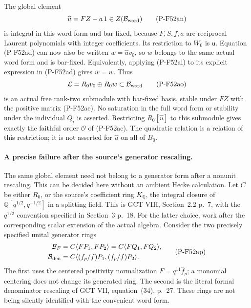 The global element
\[
         \widehat u=FZ-a\,1\in Z(\mathcal B_{\rm word})
                                                               \tag{P-F52an}
\]
is integral in this word form and bar-fixed, because
$F,S,f,a$ are reciprocal Laurent polynomials with integer
coefficients. Its restriction to $W_0$ is $\mathsf u$.
Equation (P-F52ad) can now also be written $w=\widehat u v_0$,
so $w$ belongs to the same actual word form and is bar-fixed.
Equivalently, applying (P-F52al) to its explicit expression
in (P-F52ad) gives $\overline w=w$.
Thus
\[
          \mathcal L=R_0v_0\oplus R_0w
                     \subset\mathcal B_{\rm word}
                                                               \tag{P-F52ao}
\]
is an actual free rank-two submodule with bar-fixed basis,
stable under $FZ$ with the positive matrix (P-F52ae).
No saturation in the full word form or stability under the
individual $Q_i$ is asserted. Restricting
$R_0[\widehat u]$ to this submodule gives exactly the
faithful order $\mathcal O$ of (P-F52ac).
The quadratic relation is a relation of this restriction;
it is not asserted for $\widehat u$ on all of $B_0$.

\paragraph{A precise failure after the source's generator rescaling.}
The same global element need not belong to a generator form
after a nonunit rescaling. This can be decided here without
an ambient Hecke calculation. Let $C$ be either $R_0$, or
the source's coefficient ring $K_{\mathbb Q}$, the integral
closure of $\mathbb Q[q^{1/2},q^{-1/2}]$ in a splitting
field. This is GCT VIII, Section~2.2 p.~7, with the
$q^{1/2}$ convention specified in Section~3 p.~18.
For the latter choice, work after the corresponding scalar
extension of the actual algebra.
Consider the two precisely specified unital generator rings
\[
 \begin{split}
 \mathcal B_F&=C\langle FP_1,FP_2\rangle
              =C\langle FQ_1,FQ_2\rangle,\\
 \mathcal B_{\rm den}
      &=C\langle (f_p/f)P_1,(f_p/f)P_2\rangle.
 \end{split}                                                    \tag{P-F52ap}
\]
The first uses the centered positivity normalization
$F=q^{11}\widehat f_p$; a monomial centering does not
change its generated ring. The second is the literal
formal denominator rescaling of GCT VII, equation~(34),
p.~27. These rings are not being silently identified with
the convenient word form.

